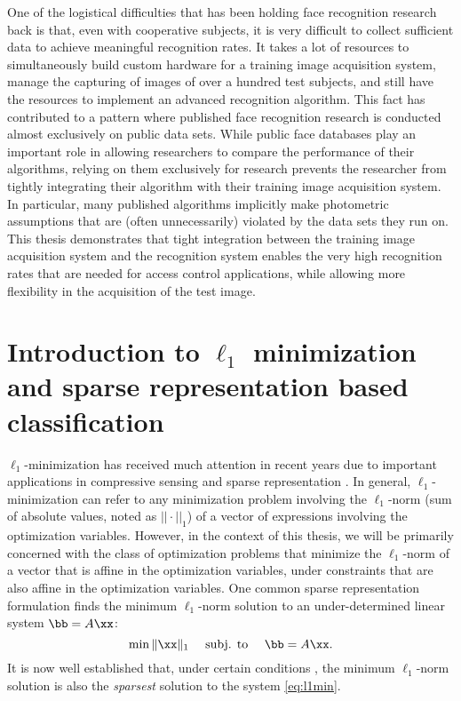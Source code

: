 One of the logistical difficulties that has been holding face recognition
research back is that, even with cooperative subjects, it is very difficult to
collect sufficient data to achieve meaningful recognition rates.  It takes a
lot of resources to simultaneously build custom hardware for a training image
acquisition system, manage the capturing of images of over a hundred test
subjects, and still have the resources to implement an advanced recognition
algorithm.  This fact has contributed to a pattern where published face
recognition research is conducted almost exclusively on public data sets.
While public face databases play an important role in allowing researchers to
compare the performance of their algorithms, relying on them exclusively for
research prevents the researcher from tightly integrating their algorithm with
their training image acquisition system.  In particular, many published
algorithms implicitly make photometric assumptions that are (often
unnecessarily) violated by the data sets they run on.  This thesis demonstrates
that tight integration between the training image acquisition system and the
recognition system enables the very high recognition rates that are needed for
access control applications, while allowing more flexibility in the acquisition
of the test image.

\section{Introduction to $\ell_1$ minimization and sparse representation based classification}
%
$\ell_1$-minimization has received much attention in recent years due to
important applications in compressive sensing \cite{BrucksteinA2007} and sparse
representation \cite{WrightJ2010-PIEEE}.  
In general, $\ell_1$-minimization can refer to any minimization problem involving the 
$\ell_1$-norm (sum of absolute values, noted as $||\cdot||_1$) of a vector of expressions involving the optimization
variables. However, in the context of this thesis, we will be primarily concerned with
the class of optimization problems that minimize the $\ell_1$-norm of a vector that
is affine in the optimization variables, under constraints that are also affine in the optimization variables.
One common sparse representation formulation finds the minimum $\ell_1$-norm solution to an
under-determined linear system $\bb=A\xx$:
%
\begin{equation} \min \|\xx\|_1\quad \mbox{ subj. to }\quad \bb = A\xx.
\label{eq:l1min} \end{equation}
%
It is now well established that, under certain conditions
\cite{CandesE2005-IT_1,DonohoD2004}, the minimum $\ell_1$-norm solution is also
the \emph{sparsest} solution to the system \eqref{eq:l1min}.

